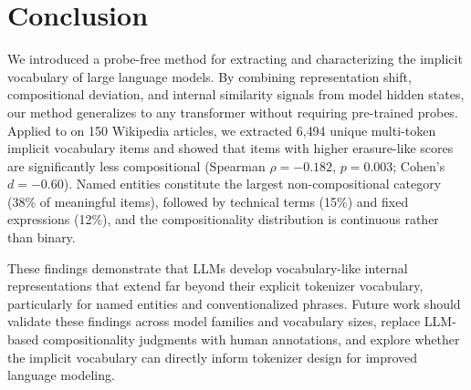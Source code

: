 \section{Conclusion}
\label{sec:conclusion}

We introduced a probe-free method for extracting and characterizing the implicit vocabulary of large language models.
By combining representation shift, compositional deviation, and internal similarity signals from model hidden states, our method generalizes to any transformer without requiring pre-trained probes.
Applied to \mistral on 150 Wikipedia articles, we extracted 6{,}494 unique multi-token implicit vocabulary items and showed that items with higher erasure-like scores are significantly less compositional (Spearman $\rho = -0.182$, $p = 0.003$; Cohen's $d = -0.60$).
Named entities constitute the largest non-compositional category (38\% of meaningful items), followed by technical terms (15\%) and fixed expressions (12\%), and the compositionality distribution is continuous rather than binary.

These findings demonstrate that LLMs develop vocabulary-like internal representations that extend far beyond their explicit tokenizer vocabulary, particularly for named entities and conventionalized phrases.
Future work should validate these findings across model families and vocabulary sizes, replace LLM-based compositionality judgments with human annotations, and explore whether the implicit vocabulary can directly inform tokenizer design for improved language modeling.
